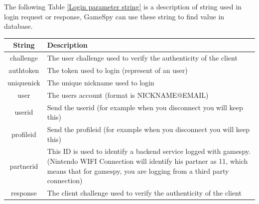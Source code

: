 \documentclass[oneside,titlepage,a4paper]{report} %
\begin{document}
The following Table \ref{Login parameter string} is a description of string used in login request or response, GameSpy can use these string to find value in database.
\begin{table}[H]
	\centering
	\begin{tabular}{|c|p{9cm}|}
		\hline
		  String    & Description                                                                                                                                                                                               \\ \hline
		 challenge  & The user challenge used to verify the authenticity of the client                                                                                                                                          \\ \hline
		 authtoken  & The token used to login (represent of an user)                                                                                                                                                            \\ \hline
		uniquenick  & The unique nickname used to login                                                                                                                                                                         \\ \hline
		   user     & The users account (format is NICKNAME@EMAIL)                                                                                                                                                              \\ \hline
		  userid    & Send the userid (for example when you disconnect you will keep this)                                                                                                                                      \\ \hline
		 profileid  & Send the profileid (for example when you disconnect you will keep this)                                                                                                                                   \\ \hline
		 partnerid  & This ID is used to identify a backend service logged with gamespy.(Nintendo WIFI Connection will identify his partner as 11, which means that for gamespy, you are logging from a third party connection) \\ \hline
		 response   & The client challenge used to verify the authenticity of the client                                                                                                                                        \\ \hline

\end{tabular}
\end{table}
\end{document}
